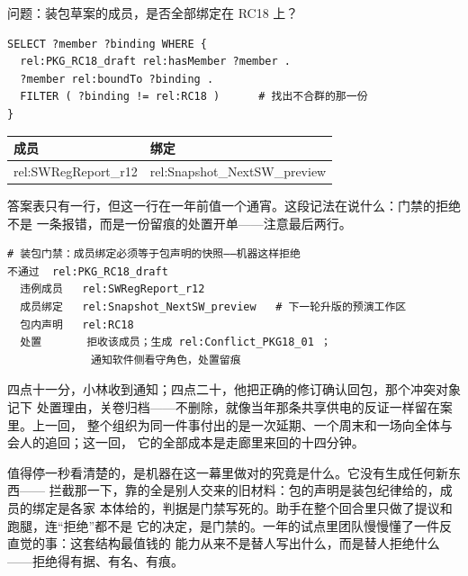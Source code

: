 问题：装包草案的成员，是否全部绑定在 RC18 上？

\nopagebreak[4]
\begin{codebox}
\begin{Verbatim}[fontsize=\small,breaklines=true,breakanywhere=true,breaksymbolleft={},breaksymbolright={}]
SELECT ?member ?binding WHERE {
  rel:PKG_RC18_draft rel:hasMember ?member .
  ?member rel:boundTo ?binding .
  FILTER ( ?binding != rel:RC18 )      # 找出不合群的那一份
}
\end{Verbatim}
\end{codebox}

\begin{center}
\begingroup\small
\setlength{\tabcolsep}{4pt}
\begin{tabularx}{\linewidth}{@{}XX@{}}
\toprule
成员 & 绑定 \\
\midrule
rel:SWRegReport\_\allowbreak{}r12 & rel:Snapshot\_\allowbreak{}NextSW\_\allowbreak{}preview \\
\bottomrule
\end{tabularx}
\endgroup
\end{center}

答案表只有一行，但这一行在一年前值一个通宵。这段记法在说什么：门禁的拒绝不是
一条报错，而是一份留痕的处置开单——注意最后两行。

\nopagebreak[4]
\begin{codebox}
\begin{Verbatim}[fontsize=\small,breaklines=true,breakanywhere=true,breaksymbolleft={},breaksymbolright={}]
# 装包门禁：成员绑定必须等于包声明的快照——机器这样拒绝
不通过  rel:PKG_RC18_draft
  违例成员   rel:SWRegReport_r12
  成员绑定   rel:Snapshot_NextSW_preview   # 下一轮升版的预演工作区
  包内声明   rel:RC18
  处置       拒收该成员；生成 rel:Conflict_PKG18_01 ；
             通知软件侧看守角色，处置留痕
\end{Verbatim}
\end{codebox}

四点十一分，小林收到通知；四点二十，他把正确的修订确认回包，那个冲突对象记下
处置理由，关卷归档——不删除，就像当年那条共享供电的反证一样留在案里。上一回，
整个组织为同一件事付出的是一次延期、一个周末和一场向全体与会人的追回；这一回，
它的全部成本是走廊里来回的十四分钟。

值得停一秒看清楚的，是机器在这一幕里做对的究竟是什么。它没有生成任何新东西——
拦截那一下，靠的全是别人交来的旧材料：包的声明是装包纪律给的，成员的绑定是各家
本体给的，判据是门禁写死的。助手在整个回合里只做了提议和跑腿，连“拒绝”都不是
它的决定，是门禁的。一年的试点里团队慢慢懂了一件反直觉的事：这套结构最值钱的
能力从来不是替人写出什么，而是替人拒绝什么——拒绝得有据、有名、有痕。

